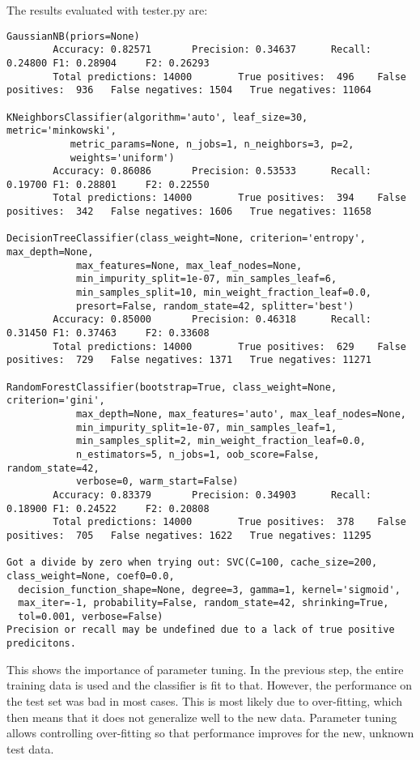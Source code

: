 \documentclass[11pt]{article} %
\begin{document}
The results evaluated with tester.py are:
{\tiny
\begin{verbatim}
GaussianNB(priors=None)
        Accuracy: 0.82571       Precision: 0.34637      Recall: 0.24800 F1: 0.28904     F2: 0.26293
        Total predictions: 14000        True positives:  496    False positives:  936   False negatives: 1504   True negatives: 11064

KNeighborsClassifier(algorithm='auto', leaf_size=30, metric='minkowski',
           metric_params=None, n_jobs=1, n_neighbors=3, p=2,
           weights='uniform')
        Accuracy: 0.86086       Precision: 0.53533      Recall: 0.19700 F1: 0.28801     F2: 0.22550
        Total predictions: 14000        True positives:  394    False positives:  342   False negatives: 1606   True negatives: 11658

DecisionTreeClassifier(class_weight=None, criterion='entropy', max_depth=None,
            max_features=None, max_leaf_nodes=None,
            min_impurity_split=1e-07, min_samples_leaf=6,
            min_samples_split=10, min_weight_fraction_leaf=0.0,
            presort=False, random_state=42, splitter='best')
        Accuracy: 0.85000       Precision: 0.46318      Recall: 0.31450 F1: 0.37463     F2: 0.33608
        Total predictions: 14000        True positives:  629    False positives:  729   False negatives: 1371   True negatives: 11271

RandomForestClassifier(bootstrap=True, class_weight=None, criterion='gini',
            max_depth=None, max_features='auto', max_leaf_nodes=None,
            min_impurity_split=1e-07, min_samples_leaf=1,
            min_samples_split=2, min_weight_fraction_leaf=0.0,
            n_estimators=5, n_jobs=1, oob_score=False, random_state=42,
            verbose=0, warm_start=False)
        Accuracy: 0.83379       Precision: 0.34903      Recall: 0.18900 F1: 0.24522     F2: 0.20808
        Total predictions: 14000        True positives:  378    False positives:  705   False negatives: 1622   True negatives: 11295

Got a divide by zero when trying out: SVC(C=100, cache_size=200, class_weight=None, coef0=0.0,
  decision_function_shape=None, degree=3, gamma=1, kernel='sigmoid',
  max_iter=-1, probability=False, random_state=42, shrinking=True,
  tol=0.001, verbose=False)
Precision or recall may be undefined due to a lack of true positive predicitons.
\end{verbatim}
}

This shows the importance of parameter tuning. In the previous step, the entire training data is used and the classifier is fit to that. However, the performance on the test set was bad in most cases. This is most likely due to over-fitting, which then means that it does not generalize well to the new data. Parameter tuning allows controlling over-fitting so that performance improves for the new, unknown test data. \medskip
\end{document}
